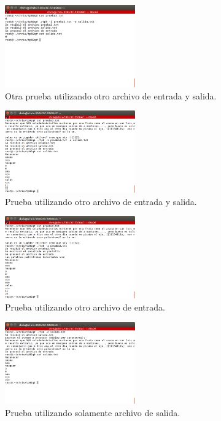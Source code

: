 \documentclass[a4paper]{article}
\begin{document}
\begin{figure}[!htp]
\begin{center}
\includegraphics[width=0.5\textwidth]{prueba2.png}
\caption{Otra prueba utilizando otro archivo de entrada y salida.} \label{fig001}
\end{center}
\end{figure}

\begin{figure}[!htp]
\begin{center}
\includegraphics[width=0.5\textwidth]{prueba3.png}
\caption{Prueba utilizando otro archivo de entrada y salida.} \label{fig001}
\end{center}
\end{figure}

\begin{figure}[!htp]
\begin{center}
\includegraphics[width=0.5\textwidth]{prueba3salidaPorPantalla.png}
\caption{Prueba utilizando otro archivo de entrada.} \label{fig001}
\end{center}
\end{figure}

\begin{figure}[!htp]
\begin{center}
\includegraphics[width=0.5\textwidth]{pruebaPorTeclado.png}
\caption{Prueba utilizando solamente archivo de salida.} \label{fig001}
\end{center}
\end{figure}
\end{document}
